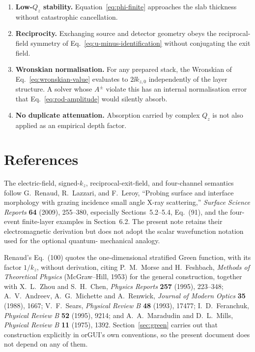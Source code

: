 \begin{enumerate}
        straddling a boundary agrees with the same atom list represented as two
        records.
  \item \textbf{Low-$Q_z$ stability.}  Equation~\eqref{eq:phi-finite} approaches
        the slab thickness without catastrophic cancellation.
  \item \textbf{Reciprocity.}  Exchanging source and detector geometry obeys
        the reciprocal-field symmetry of
        Eq.~\eqref{eq:u-minus-identification} without conjugating the exit
        field.
  \item \textbf{Wronskian normalisation.}  For any prepared stack, the
        Wronskian of Eq.~\eqref{eq:wronskian-value} evaluates to
        $2\ii k_{z,0}$ independently of the layer structure.  A solver whose
        $A^\pm$ violate this has an internal normalisation error that
        Eq.~\eqref{eq:rod-amplitude} would silently absorb.
  \item \textbf{No duplicate attenuation.}  Absorption carried by complex
        $Q_z$ is not also applied as an empirical depth factor.
\end{enumerate}

\section{References}

The electric-field, signed-$k_z$, reciprocal-exit-field, and four-channel
semantics follow G.~Renaud, R.~Lazzari, and F.~Leroy, ``Probing surface and
interface morphology with grazing incidence small angle X-ray scattering,''
\emph{Surface Science Reports} \textbf{64} (2009), 255--380, especially
Sections~5.2--5.4, Eq.~(91), and the four-event finite-layer examples in
Section~6.2.  The present note retains their electromagnetic derivation but
does not adopt the scalar wavefunction notation used for the optional quantum-
mechanical analogy.

Renaud's Eq.~(100) quotes the one-dimensional stratified Green function, with
its factor $1/k_z$, without derivation, citing P.~M.~Morse and H.~Feshbach,
\emph{Methods of Theoretical Physics} (McGraw--Hill, 1953) for the general
construction, together with X.~L.~Zhou and S.~H.~Chen, \emph{Physics Reports}
\textbf{257} (1995), 223--348; A.~V.~Andreev, A.~G.~Michette and A.~Renwick,
\emph{Journal of Modern Optics} \textbf{35} (1988), 1667; V.~F.~Sears,
\emph{Physical Review B} \textbf{48} (1993), 17477; I.~D.~Feranchuk,
\emph{Physical Review B} \textbf{52} (1995), 9214; and A.~A.~Maradudin and
D.~L.~Mills, \emph{Physical Review B} \textbf{11} (1975), 1392.
Section~\ref{sec:green} carries out that construction explicitly in orGUI's
own conventions, so the present document does not depend on any of them.

